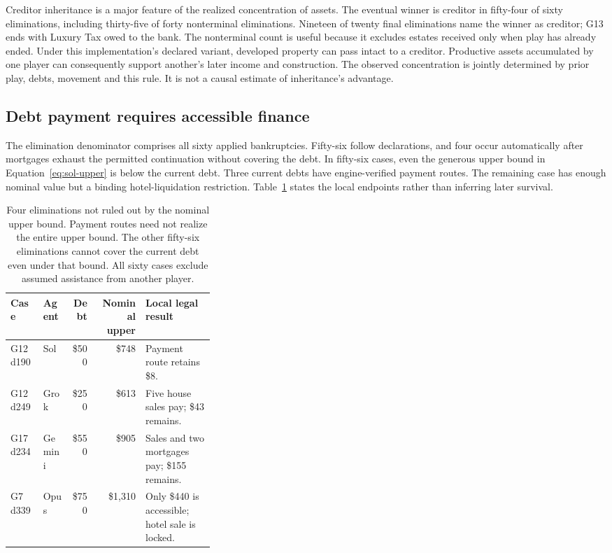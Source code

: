Creditor inheritance is a major feature of the realized concentration of assets. The eventual winner is creditor in fifty-four of sixty eliminations, including thirty-five of forty nonterminal eliminations. Nineteen of twenty final eliminations name the winner as creditor; G13 ends with Luxury Tax owed to the bank. The nonterminal count is useful because it excludes estates received only when play has already ended. Under this implementation's declared variant, developed property can pass intact to a creditor. Productive assets accumulated by one player can consequently support another's later income and construction. The observed concentration is jointly determined by prior play, debts, movement and this rule. It is not a causal estimate of inheritance's advantage.

\subsection{Debt payment requires accessible finance}

The elimination denominator comprises all sixty applied bankruptcies. Fifty-six follow declarations, and four occur automatically after mortgages exhaust the permitted continuation without covering the debt. In fifty-six cases, even the generous upper bound in Equation~\ref{eq:sol-upper} is below the current debt. Three current debts have engine-verified payment routes. The remaining case has enough nominal value but a binding hotel-liquidation restriction. Table~\ref{tab:sol-financing} states the local endpoints rather than inferring later survival.

\begin{table}[t]
\centering
\small
\begin{tabular}{llrrp{0.34\linewidth}}
\toprule
Case & Agent & Debt & Nominal upper & Local legal result \\
\midrule
G12 d190 & Sol & \$500 & \$748 & Payment route retains \$8. \\
G12 d249 & Grok & \$250 & \$613 & Five house sales pay; \$43 remains. \\
G17 d234 & Gemini & \$550 & \$905 & Sales and two mortgages pay; \$155 remains. \\
G7 d339 & Opus & \$750 & \$1,310 & Only \$440 is accessible; hotel sale is locked. \\
\bottomrule
\end{tabular}
\caption{Four eliminations not ruled out by the nominal upper bound. Payment routes need not realize the entire upper bound. The other fifty-six eliminations cannot cover the current debt even under that bound. All sixty cases exclude assumed assistance from another player.}
\label{tab:sol-financing}
\end{table}

